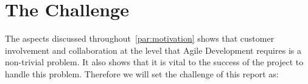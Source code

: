 \section{The Challenge}\label{subsec:theChallenge}
The aspects discussed throughout~\autoref{par:motivation} shows that customer involvement and collaboration at the level that Agile Development requires is a non-trivial problem.
It also shows that it is vital to the success of the project to handle this problem.
Therefore we will set the challenge of this report as: \\
\noindent\hrulefill\par
\noindent{} \\
